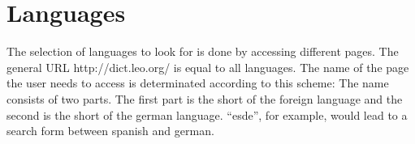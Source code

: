 \documentclass{article}
\begin{document}
\section{Languages}

The selection of languages to look for is done by accessing different pages. 
The general URL http://dict.leo.org/ is equal to all languages. The name of the
page the user needs to access is determinated according to this scheme:
The name consists of two parts. The first part is the short of the foreign language and the second is the short of the german language. ``esde'', for example, would lead to a search form between spanish and german.
\end{document}
